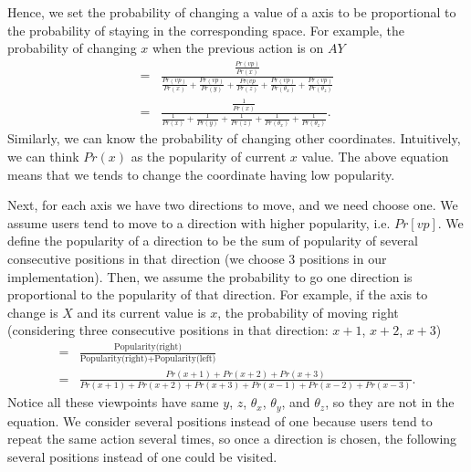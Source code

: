 Hence, we set the probability of changing a value of a axis to be proportional to the probability of staying in the
corresponding space. For example, the probability of changing $x$ when the previous action is on $AY$
\begin{align*}
    =&\frac{\frac{Pr(vp)}{Pr(x)}}
            {\frac{Pr(vp)}{Pr(x)}
            +\frac{Pr(vp)}{Pr(y)}
            +\frac{Pr(vp}{Pr(z)}
            +\frac{Pr(vp)}{Pr(\theta_x)}
            +\frac{Pr(vp)}{Pr(\theta_z)}}\\
    =& \frac{\frac{1}{Pr(x)}}
            {\frac{1}{Pr(x)}
            +\frac{1}{Pr(y)}
            +\frac{1}{Pr(z)}
            +\frac{1}{Pr(\theta_x)}
            +\frac{1}{Pr(\theta_z)}
            }.
\end{align*}
Similarly, we can know the probability of changing other coordinates. Intuitively, we can think $Pr(x)$ as 
the popularity of current $x$ value. The above equation means that we tends to change the coordinate having low
popularity.


Next, for each axis we have two directions to move, and we need choose one.
We assume users tend to move to a direction with higher popularity, i.e. $Pr[vp]$. 
We define the popularity of a direction to be the sum of popularity of several consecutive positions in that direction
(we choose 3 positions in our implementation). 
Then, we assume the probability to go one direction is proportional to the popularity of that direction.
For example, if the axis to change is $X$ and its current value is $x$, 
the probability of moving right (considering three consecutive positions in that direction: $x+1$, $x+2$, $x+3$)
\begin{align*}
    =&\frac{\textrm{Popularity(right)}}
    {\textrm{Popularity(right)} + \textrm{Popularity(left)}} \\
   =&\frac{Pr(x+1)+Pr(x+2)+Pr(x+3)}
          {Pr(x+1)+Pr(x+2)+Pr(x+3)+Pr(x-1)+Pr(x-2)+Pr(x-3)}.
\end{align*}
Notice all these viewpoints have same $y$, $z$, $\theta_x$, $\theta_y$, and $\theta_z$, so they are not in
the equation. We consider several positions instead of one because users tend to repeat the same action several times,
so once a direction is chosen, the following several positions instead of one could be visited. 

